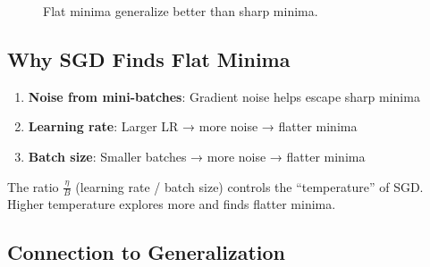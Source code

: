\begin{figure}[H]
\centering
{}
\caption{Flat minima generalize better than sharp minima.}
\end{figure}

\subsection{Why SGD Finds Flat Minima}

\begin{enumerate}
    \item \textbf{Noise from mini-batches}: Gradient noise helps escape sharp minima
    \item \textbf{Learning rate}: Larger LR → more noise → flatter minima
    \item \textbf{Batch size}: Smaller batches → more noise → flatter minima
\end{enumerate}

\begin{keyinsight}
The ratio $\frac{\eta}{B}$ (learning rate / batch size) controls the ``temperature'' of SGD. Higher temperature explores more and finds flatter minima.
\end{keyinsight}

\subsection{Connection to Generalization}

